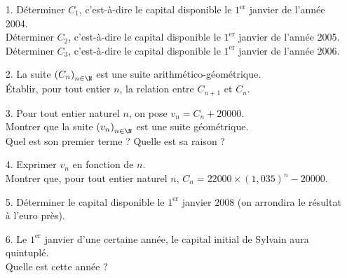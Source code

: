 \begin{itemize}
\item[1.] Déterminer $C_1$, c'est-à-dire le capital disponible le $1^{\mathrm{er}}$ janvier de l'année 2004. \\
Déterminer $C_2$, c'est-à-dire le capital disponible le $1^{\mathrm{er}}$ janvier de l'année 2005. \\
Déterminer $C_3$, c'est-à-dire le capital disponible le $1^{\mathrm{er}}$ janvier de l'année 2006. \\
\item[2.] La suite $\left(C_n\right)_{n \in \N}$ est une suite arithmético-géométrique. \\ Établir, pour tout entier $n$, la relation entre $C_{n+1}$ et $C_{n}$. \\
\item[3.] Pour tout entier naturel $n$, on pose $v_n = C_n + 20 000$. \\ Montrer que la suite $\left(v_n\right)_{n \in \N}$ est une suite géométrique. \\ Quel est son premier terme ? Quelle est sa raison ? \\
\item[4.] Exprimer $v_n$ en fonction de $n$. \\ Montrer que, pour tout entier naturel $n$, $C_n = 22 000 \times \left(1,035\right)^n - 20000$. \\
\item[5.] Déterminer le capital disponible le $1^{\mathrm{er}}$ janvier 2008 (on arrondira le résultat à l'euro près). \\
\item[6.] Le $1^{\mathrm{er}}$ janvier d'une certaine année, le capital initial de Sylvain aura quintuplé. \\ Quelle est cette année ? \\
\end{itemize}

\vspace*{.3cm}

